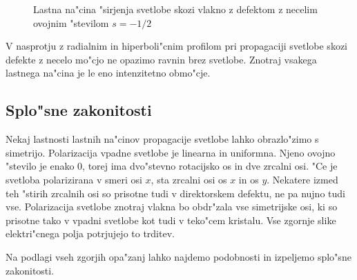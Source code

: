 \documentclass[a4paper,10pt]{article}
\begin{document}
\begin{figure}[h]
 \centering
 \caption{Lastna na"cina "sirjenja svetlobe skozi vlakno z defektom z necelim ovojnim "stevilom $s=-1/2$}
 \label{fig:pulse-m12-mode}
\end{figure}

V nasprotju z radialnim in hiperboli"cnim profilom pri propagaciji svetlobe skozi defekte z necelo mo"cjo ne opazimo ravnin brez svetlobe. 
Znotraj vsakega lastnega na"cina je le eno intenzitetno obmo"cje. 

\subsection{Splo"sne zakonitosti}
Nekaj lastnosti lastnih na"cinov propagacije svetlobe lahko obrazlo"zimo s simetrijo. 
Polarizacija vpadne svetlobe je linearna in uniformna. 
Njeno ovojno "stevilo je enako 0, torej ima dvo"stevno rotacijsko os in dve zrcalni osi. 
"Ce je svetloba polarizirana v smeri osi $x$, sta zrcalni osi os $x$ in os $y$. 
Nekatere izmed teh "stirih zrcalnih osi so prisotne tudi v direktorskem defektu, ne pa nujno tudi vse. 
Polarizacija svetlobe znotraj vlakna bo obdr"zala vse simetrijske osi, ki so prisotne tako v vpadni svetlobe kot tudi v teko"cem kristalu. 
Vse zgornje slike elektri"cnega polja potrjujejo to trditev. 

Na podlagi vseh zgorjih opa"zanj lahko najdemo podobnosti in izpeljemo splo"sne zakonitosti. 
\end{document}
